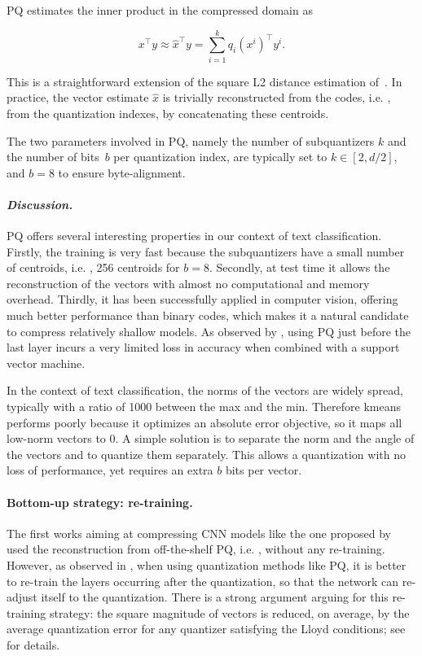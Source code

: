 PQ estimates the inner product in the compressed domain as

\begin{equation}
x^\top y  \approx \hat{x}^\top y = \sum_{i=1}^k q_i(x^i)^\top y^i.
\end{equation}

This is a straightforward extension of the square L2 distance estimation of~\citet{JDS11}.
In practice, the vector estimate $\hat{x}$ is trivially reconstructed from the codes, i.e. , from the quantization indexes, by concatenating these centroids. 

The two parameters involved in PQ, namely the number of subquantizers $k$ and the number of bits~$b$ per quantization index, are typically set to $k \in [2,d/2]$, and $b=8$ to ensure byte-alignment. 

\paragraph{\it Discussion.} PQ offers several interesting properties in our context of text classification. Firstly, the training is very fast because the subquantizers have a small number of centroids, i.e. , 256 centroids for $b=8$. Secondly, at test time it allows the reconstruction of the vectors with almost no computational and memory overhead. Thirdly, it has been successfully applied in computer vision, offering much better performance than binary codes, which makes it a natural candidate to compress relatively shallow models. As observed by \cite{SP11}, using PQ just before the last layer incurs a very limited loss in accuracy when combined with a support vector machine.

In the context of text classification, the norms of the vectors are widely spread, typically with a ratio of 1000 between the max and the min. Therefore kmeans performs poorly because it optimizes an absolute error objective, so it maps all low-norm vectors to 0. A simple solution is to separate the norm and the angle of the vectors and to quantize them separately. This allows a quantization with no loss of performance, yet requires an extra $b$ bits per vector.

\paragraph{Bottom-up strategy: re-training.} The first works aiming at compressing CNN models like the one proposed by~\citep{GLYB14} used the reconstruction from off-the-shelf PQ, i.e. , without any re-training. However,  as observed in \citet{S16}, when using quantization methods like PQ, it is better to re-train the layers occurring after the quantization, so that the network can re-adjust itself to the quantization. There is a strong argument arguing for this re-training strategy: the square magnitude of vectors is reduced, on average, by the average quantization error for any quantizer satisfying the Lloyd conditions;
see~\citet{JDS11} for details.  


